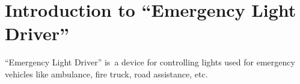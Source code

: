 \section{Introduction to ``Emergency Light Driver''}

``Emergency Light Driver'' is~a device for controlling lights used for emergency vehicles like
ambulance, fire truck, road assistance, etc. 
